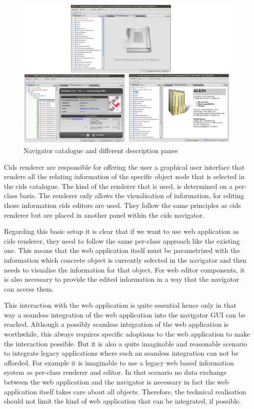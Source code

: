 \begin{figure}
	\centering \includegraphics[width=1.0\textwidth]{./img/conception/desc_panes.png}
	\caption{Navigator catalogue and different description panes}
	\label{fig:desc_panes}
\end{figure}

Cids renderer are responsible for offering the user a graphical user interface that renders all the relating information of the specific object node that is selected in the cids catalogue.
The kind of the renderer that is used, is determined on a per-class basis.
The renderer only allows the visualisation of information, for editing those information cids editors are used.
They follow the same principles as cids renderer but are placed in another panel within the cids navigator.

Regarding this basic setup it is clear that if we want to use  web application as cids renderer, they need to follow the same per-class approach like the existing one.
This means that the web application itself must be parametrized with the information which concrete object is currently selected in the navigator and then needs to visualise the information for that object.
For web editor components, it is also necessary to provide the edited information in a way that the navigator can access them.

This interaction with the web application is quite essential hence only in that way a seamless integration of the web application into the navigator GUI can be reached.
Although a possibly seamless integration of the web application is worthwhile, this always requires specific adoptions to the web application to make the interaction possible.
But it is also a quite imaginable and reasonable scenario to integrate legacy applications where such an seamless integration can not be afforded.
For example it is imaginable to use a legacy web based information system as per-class renderer and editor.
In that scenario no data exchange between the web application and the navigator is necessary in fact the web application itself takes care about all objects.
Therefore, the technical realisation should not limit the kind of web application that can be integrated, if possible.

